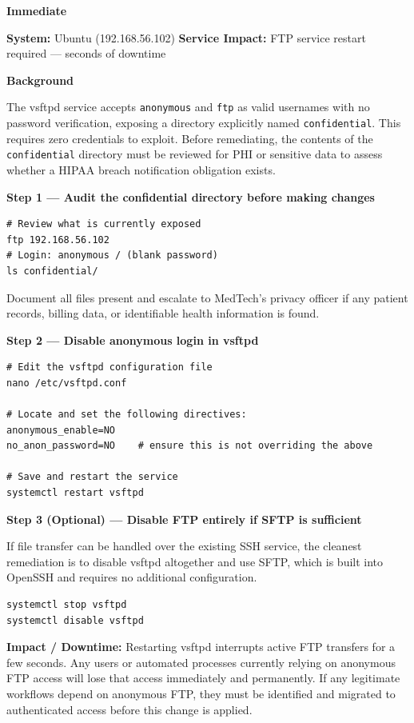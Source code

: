 \documentclass[12pt]{article}
\newcommand{\tfbadge}[2]{%
  \colorbox{#1}{\color{white}\textbf{\small #2}}%
}
\begin{document}
\noindent\tfbadge{immediatecol}{Immediate}
\quad\textbf{System:} Ubuntu (192.168.56.102)
\quad\textbf{Service Impact:} FTP service restart required --- seconds of
downtime
 
\bigskip
\noindent\textbf{Background}
 
The vsftpd service accepts \texttt{anonymous} and \texttt{ftp} as valid
usernames with no password verification, exposing a directory explicitly named
\texttt{confidential}. This requires zero credentials to exploit. Before
remediating, the contents of the \texttt{confidential} directory must be
reviewed for PHI or sensitive data to assess whether a HIPAA breach
notification obligation exists.
 
\bigskip
\noindent\textbf{Step 1 --- Audit the confidential directory before making changes}
 
\begin{lstlisting}[style=terminal]
# Review what is currently exposed
ftp 192.168.56.102
# Login: anonymous / (blank password)
ls confidential/
\end{lstlisting}
 
Document all files present and escalate to MedTech's privacy officer if any
patient records, billing data, or identifiable health information is found.
 
\bigskip
\noindent\textbf{Step 2 --- Disable anonymous login in vsftpd}
 
\begin{lstlisting}[style=terminal]
# Edit the vsftpd configuration file
nano /etc/vsftpd.conf
 
# Locate and set the following directives:
anonymous_enable=NO
no_anon_password=NO    # ensure this is not overriding the above
 
# Save and restart the service
systemctl restart vsftpd
\end{lstlisting}
 
\bigskip
\noindent\textbf{Step 3 (Optional) --- Disable FTP entirely if SFTP is sufficient}
 
If file transfer can be handled over the existing SSH service, the cleanest
remediation is to disable vsftpd altogether and use SFTP, which is built into
OpenSSH and requires no additional configuration.
 
\begin{lstlisting}[style=terminal]
systemctl stop vsftpd
systemctl disable vsftpd
\end{lstlisting}
 
\begin{impactbox}
\textbf{Impact / Downtime:} Restarting vsftpd interrupts active FTP transfers
for a few seconds. Any users or automated processes currently relying on
anonymous FTP access will lose that access immediately and permanently. If
any legitimate workflows depend on anonymous FTP, they must be identified and
migrated to authenticated access before this change is applied.
\end{impactbox}
 
\end{document}
